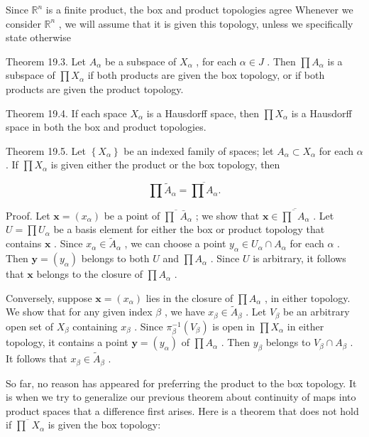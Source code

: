 \documentclass[10pt]{article}
\begin{document}
Since \({\mathbb{R}}^{n}\) is a finite product, the box and product topologies agree Whenever we consider \({\mathbb{R}}^{n}\) , we will assume that it is given this topology, unless we specifically state otherwise

Theorem 19.3. Let \({A}_{\alpha }\) be a subspace of \({X}_{\alpha }\) , for each \(\alpha  \in  J\) . Then \(\prod {A}_{\alpha }\) is a subspace of \(\prod {X}_{\alpha }\) if both products are given the box topology, or if both products are given the product topology.

Theorem 19.4. If each space \({X}_{\alpha }\) is a Hausdorff space, then \(\prod {X}_{\alpha }\) is a Hausdorff space in both the box and product topologies.

Theorem 19.5. Let \(\left\{  {X}_{\alpha }\right\}\) be an indexed family of spaces; let \({A}_{\alpha } \subset  {X}_{\alpha }\) for each \(\alpha\) . If \(\prod {X}_{\alpha }\) is given either the product or the box topology, then

\[
\prod {\widetilde{A}}_{\alpha } = \overline{\prod {A}_{\alpha }}.
\]

Proof. Let \(\mathbf{x} = \left( {x}_{\alpha }\right)\) be a point of \(\overline{\prod }{\bar{A}}_{\alpha }\) ; we show that \(\mathbf{x} \in  \overline{\overline{\prod }{A}_{\alpha }}\) . Let \(U = \prod {U}_{\alpha }\) be a basis element for either the box or product topology that contains \(\mathbf{x}\) . Since \({x}_{\alpha } \in  {\widetilde{A}}_{\alpha }\) , we can choose a point \({y}_{\alpha } \in  {U}_{\alpha } \cap  {A}_{\alpha }\) for each \(\alpha\) . Then \(\mathbf{y} = \left( {y}_{\alpha }\right)\) belongs to both \(U\) and \(\prod {A}_{\alpha }\) . Since \(U\) is arbitrary, it follows that \(\mathbf{x}\) belongs to the closure of \(\prod {A}_{\alpha }\) .

Conversely, suppose \(\mathbf{x} = \left( {x}_{\alpha }\right)\) lies in the closure of \(\prod {A}_{\alpha }\) , in either topology. We show that for any given index \(\beta\) , we have \({x}_{\beta } \in  {\widetilde{A}}_{\beta }\) . Let \({V}_{\beta }\) be an arbitrary open set of \({X}_{\beta }\) containing \({x}_{\beta }\) . Since \({\pi }_{\beta }^{-1}\left( {V}_{\beta }\right)\) is open in \(\prod {X}_{\alpha }\) in either topology, it contains a point \(\mathbf{y} = \left( {y}_{\alpha }\right)\) of \(\prod {A}_{\alpha }\) . Then \({y}_{\beta }\) belongs to \({V}_{\beta } \cap  {A}_{\beta }\) . It follows that \({x}_{\beta } \in  {\widetilde{A}}_{\beta }\) .

So far, no reason has appeared for preferring the product to the box topology. It is when we try to generalize our previous theorem about continuity of maps into product spaces that a difference first arises. Here is a theorem that does not hold if \(\overline{\prod }{X}_{\alpha }\) is given the box topology:
\end{document}
